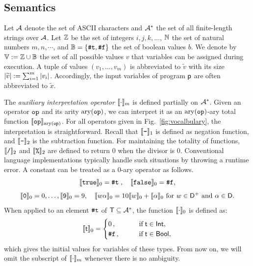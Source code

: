 \documentclass[runningheads]{llncs}
\begin{document}
\subsection{Semantics}
\label{subsec:semantics}
Let $\mathcal{A}$ denote the set of ASCII characters and $\mathcal{A}^{*}$ the set of all finite-length strings over $\mathcal{A}$.
Let $\mathbb{Z}$ be the set of integers $i, j, k, \dots$, $\mathbb{N}$ the set of natural numbers $m, n, \cdots$, and $\mathbb{B}=\{\texttt{\#}\mathtt{t},\texttt{\#}\mathtt{f}\}$ the set of boolean values $b$.
We denote by $\mathbb{V}:=\mathbb{Z}\cup\mathbb{B}$ the set of all possible values $v$ that variables can be assigned during execution.
A tuple of values $(v_1, \ldots, v_m)$ is abbreviated to $\widetilde{v}$ with its size $\vert\widetilde{v}\vert:=\sum_{i=1}^m\vert v_i\vert$.
Accordingly, the input variables of program $\mathsf{p}$ are often abbreviated to $\widetilde{x}$.

The \textit{auxiliary interpretation operator} $\llbracket\cdot\rrbracket_{m}$ is defined partially on $\mathcal{A}^{*}$.
Given an operator $\mathtt{op}$ and its arity $\mathrm{ary}(\mathtt{op})$, we can
interpret it as an $\mathrm{ary}(\mathtt{op})$-ary total function $\llbracket\mathtt{op}\rrbracket_{\mathrm{ary}(\mathtt{op})}$.
For all operators given in Fig.~\ref{fig:vocalbulary}, the interpretation is straightforward.
Recall that $\llbracket\texttt{-}\rrbracket_{1}$ is defined as negation function, and $\llbracket\texttt{-}\rrbracket_{2}$ is the subtraction function.
For maintaining the totality of functions, $\llbracket\texttt{/}\rrbracket_{2}$ and $\llbracket\texttt{\%}\rrbracket_{2}$ are defined to return $0$ when the divisor is $0$.
Conventional language implementations typically handle such situations by throwing a runtime error.
A constant can be treated as a $0$-ary operator as follows.
\begin{equation}
    \llbracket\texttt{true}\rrbracket_{0}=\texttt{\#}\mathtt{t}\;,\quad \llbracket\texttt{false}\rrbracket_{0}=\texttt{\#}\mathtt{f},
\end{equation}
\begin{equation}
    \llbracket\texttt{0}\rrbracket_{0}=0,\dots,\llbracket\texttt{9}\rrbracket_{0}=9,\quad\llbracket w\alpha\rrbracket_{0}=10\llbracket w\rrbracket_{0}+\llbracket\alpha\rrbracket_{0}\text{ for }w\in\mathsf{D}^{+}\text{ and }\alpha\in \mathsf{D}.
\end{equation}
When applied to an element $\texttt{\#}\mathtt{t}$ of $\mathsf{T}\subseteq \mathcal{A}^{*}$, the function $\llbracket\cdot\rrbracket_{0}$ is defined as:
\begin{equation}
   \llbracket\mathsf{t}\rrbracket_{0}=
\begin{cases}
0\,,\quad&\text{if}\;\mathsf{t}\in\mathsf{Int}, \\
\texttt{\#}\mathtt{f}\,,\qquad&\text{if}\;\mathsf{t}\in\mathsf{Bool},
\end{cases}
\end{equation}
which gives the initial values for variables of these types.
From now on, we will omit the subscript of $\llbracket\cdot\rrbracket_{m}$ whenever there is no ambiguity.
\end{document}
